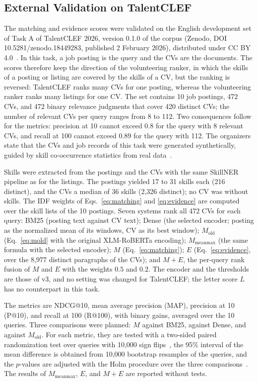 \documentclass[CHICAGO]{USG}
\begin{document}
\subsection{External Validation on TalentCLEF}
\label{sec:talentclef}
The matching and evidence scores were validated on the English development set of Task A of TalentCLEF 2026, version 0.1.0 of the corpus (Zenodo, DOI 10.5281/zenodo.18449283, published 2 February 2026), distributed under CC BY 4.0~\citep{talentclef2026}. %
In this task, a job posting is the query and the CVs are the documents. The scores therefore keep the direction of the volunteering ranker, in which the skills of a posting or listing are covered by the skills of a CV, but the ranking is reversed: TalentCLEF ranks many CVs for one posting, whereas the volunteering ranker ranks many listings for one CV. The set contains 10 job postings, 472 CVs, and 472 binary relevance judgments that cover 420 distinct CVs; the number of relevant CVs per query ranges from 8 to 112. %
Two consequences follow for the metrics: precision at 10 cannot exceed 0.8 for the query with 8 relevant CVs, and recall at 100 cannot exceed 0.89 for the query with 112. The organizers state that the CVs and job records of this task were generated synthetically, guided by skill co-occurrence statistics from real data~\citep{gasco2026overview}.

Skills were extracted from the postings and the CVs with the same SkillNER pipeline as for the listings. The postings yielded 17 to 31 skills each (216 distinct), and the CVs a median of 36 skills (2{,}326 distinct); no CV was without skills. %
The IDF weights of Eqs.~\eqref{eq:matching} and \eqref{eq:evidence} are computed over the skill lists of the 10 postings. Seven systems rank all 472 CVs for each query:
BM25 (posting text against CV text);
Dense (the selected encoder; posting as the normalized mean of its windows, CV as its best window);
$M_{\mathrm{old}}$ (Eq.~\eqref{eq:mold} with the original XLM-RoBERTa encoding);
$M_{\mathrm{meanmax}}$ (the same formula with the selected encoder);
$M$ (Eq.~\eqref{eq:matching});
$E$ (Eq.~\eqref{eq:evidence}, over the 8{,}977 distinct paragraphs of the CVs);
and $M{+}E$, the per-query rank fusion of $M$ and $E$ with the weights $0.5$ and $0.2$. %
The encoder and the thresholds are those of v3, and no setting was changed for TalentCLEF; the letter score $L$ has no counterpart in this task. %

The metrics are NDCG@10, mean average precision (MAP), precision at 10 (P@10), and recall at 100 (R@100), with binary gains, averaged over the 10 queries. Three comparisons were planned: $M$ against BM25, against Dense, and against $M_{\mathrm{old}}$. For each metric, they are tested with a two-sided paired randomization test over queries with 10{,}000 sign flips~\citep{smucker2007}, the 95\% interval of the mean difference is obtained from 10{,}000 bootstrap resamples of the queries, and the $p$-values are adjusted with the Holm procedure over the three comparisons~\citep{holm1979}. %
The results of $M_{\mathrm{meanmax}}$, $E$, and $M{+}E$ are reported without tests.
\end{document}
